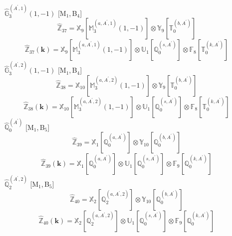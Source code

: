\documentclass[fleqn,10pt,landscape]{article}
\begin{document}
\begin{itemize}
\begin{dmath*}
\end{dmath*}
\vspace{4mm}
\noindent {} $\,\,\,\hat{\mathbb{G}}_{3}^{(A^{\prime},1)}(1,-1)$ [M$_{1}$,\,B$_{4}$]
\begin{dmath*}
\hat{\mathbb{Z}}_{37}=\mathbb{X}_{9}[\mathbb{M}_{3}^{(a,A^{\prime},1)}(1,-1)] \otimes\mathbb{Y}_{9}[\mathbb{T}_{0}^{(b,A^{\prime})}]
\end{dmath*}
\begin{dmath*}
\hat{\mathbb{Z}}_{37}(\bm{k})=\mathbb{X}_{9}[\mathbb{M}_{3}^{(a,A^{\prime},1)}(1,-1)] \otimes\mathbb{U}_{1}[\mathbb{Q}_{0}^{(s,A^{\prime})}] \otimes\mathbb{F}_{8}[\mathbb{T}_{0}^{(k,A^{\prime})}]
\end{dmath*}
\vspace{4mm}
\noindent {} $\,\,\,\hat{\mathbb{G}}_{3}^{(A^{\prime},2)}(1,-1)$ [M$_{1}$,\,B$_{4}$]
\begin{dmath*}
\hat{\mathbb{Z}}_{38}=\mathbb{X}_{10}[\mathbb{M}_{3}^{(a,A^{\prime},2)}(1,-1)] \otimes\mathbb{Y}_{9}[\mathbb{T}_{0}^{(b,A^{\prime})}]
\end{dmath*}
\begin{dmath*}
\hat{\mathbb{Z}}_{38}(\bm{k})=\mathbb{X}_{10}[\mathbb{M}_{3}^{(a,A^{\prime},2)}(1,-1)] \otimes\mathbb{U}_{1}[\mathbb{Q}_{0}^{(s,A^{\prime})}] \otimes\mathbb{F}_{8}[\mathbb{T}_{0}^{(k,A^{\prime})}]
\end{dmath*}
\vspace{4mm}
\noindent {} $\,\,\,\hat{\mathbb{Q}}_{0}^{(A^{\prime})}$ [M$_{1}$,\,B$_{5}$]
\begin{dmath*}
\hat{\mathbb{Z}}_{39}=\mathbb{X}_{1}[\mathbb{Q}_{0}^{(a,A^{\prime})}] \otimes\mathbb{Y}_{10}[\mathbb{Q}_{0}^{(b,A^{\prime})}]
\end{dmath*}
\begin{dmath*}
\hat{\mathbb{Z}}_{39}(\bm{k})=\mathbb{X}_{1}[\mathbb{Q}_{0}^{(a,A^{\prime})}] \otimes\mathbb{U}_{1}[\mathbb{Q}_{0}^{(s,A^{\prime})}] \otimes\mathbb{F}_{9}[\mathbb{Q}_{0}^{(k,A^{\prime})}]
\end{dmath*}
\vspace{4mm}
\noindent {} $\,\,\,\hat{\mathbb{Q}}_{2}^{(A^{\prime},2)}$ [M$_{1}$,\,B$_{5}$]
\begin{dmath*}
\hat{\mathbb{Z}}_{40}=\mathbb{X}_{2}[\mathbb{Q}_{2}^{(a,A^{\prime},2)}] \otimes\mathbb{Y}_{10}[\mathbb{Q}_{0}^{(b,A^{\prime})}]
\end{dmath*}
\begin{dmath*}
\hat{\mathbb{Z}}_{40}(\bm{k})=\mathbb{X}_{2}[\mathbb{Q}_{2}^{(a,A^{\prime},2)}] \otimes\mathbb{U}_{1}[\mathbb{Q}_{0}^{(s,A^{\prime})}] \otimes\mathbb{F}_{9}[\mathbb{Q}_{0}^{(k,A^{\prime})}]

\end{dmath*}
\end{itemize}
\end{document}
